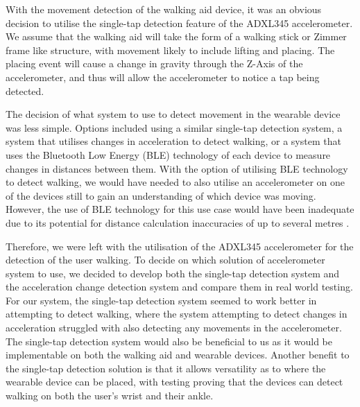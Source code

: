            With the movement detection of the walking aid device, it was an obvious decision to utilise the single-tap detection feature of the ADXL345 accelerometer. We assume that the walking aid will take the form of a walking stick or Zimmer frame like structure, with movement likely to include lifting and placing. The placing event will cause a change in gravity through the Z-Axis of the accelerometer, and thus will allow the accelerometer to notice a tap being detected.

           The decision of what system to use to detect movement in the wearable device was less simple. Options included using a similar single-tap detection system, a system that utilises changes in acceleration to detect walking, or a system that uses the Bluetooth Low Energy (BLE) technology of each device to measure changes in distances between them. With the option of utilising BLE technology to detect walking, we would have needed to also utilise an accelerometer on one of the devices still to gain an understanding of which device was moving. However, the use of BLE technology for this use case would have been inadequate due to its potential for distance calculation inaccuracies of up to several metres \cite{Fachri_2019}. 

           Therefore, we were left with the utilisation of the ADXL345 accelerometer for the detection of the user walking. To decide on which solution of accelerometer system to use, we decided to develop both the single-tap detection system and the acceleration change detection system and compare them in real world testing. For our system, the single-tap detection system seemed to work better in attempting to detect walking, where the system attempting to detect changes in acceleration struggled with also detecting any movements in the accelerometer. The single-tap detection system would also be beneficial to us as it would be implementable on both the walking aid and wearable devices. Another benefit to the single-tap detection solution is that it allows versatility as to where the wearable device can be placed, with testing proving that the devices can detect walking on both the user's wrist and their ankle. 

